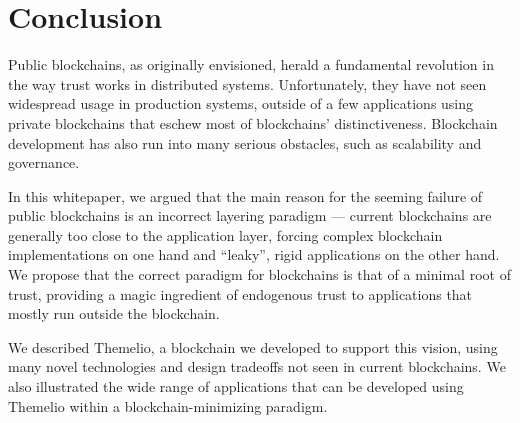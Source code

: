 \documentclass[headinclude,12pt]{scrbook}
\begin{document}
\chapter*{Conclusion}

Public blockchains, as originally envisioned, herald a fundamental revolution in the way trust works in distributed systems. Unfortunately, they have not seen widespread usage in production systems, outside of a few applications using private blockchains that eschew most of blockchains' distinctiveness. Blockchain development has also run into many serious obstacles, such as scalability and governance.

In this whitepaper, we argued that the main reason for the seeming failure of public blockchains is an incorrect layering paradigm --- current blockchains are generally too close to the application layer, forcing complex blockchain implementations on one hand and ``leaky'', rigid applications on the other hand. We propose that the correct paradigm for blockchains is that of a minimal root of trust, providing a magic ingredient of endogenous trust to applications that mostly run outside the blockchain.

We described Themelio, a blockchain we developed to support this vision, using many novel technologies and design tradeoffs not seen in current blockchains. We also illustrated the wide range of applications that can be developed using Themelio within a blockchain-minimizing paradigm.


\printbibliography
\end{document}
